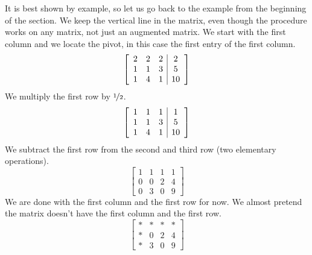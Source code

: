 \documentclass{ximera}
\begin{document}
It is best shown by example, so let us go back to the example from the beginning of the section. We keep the vertical line in the matrix, even though the procedure works on any matrix, not just an augmented matrix. We start with the first column and we locate the pivot, in this case the first entry of the first column.
\begin{equation*}
    \left[
        \begin{array}{ccc|c}
            2 & 2 & 2 & 2 \\
            1 & 1 & 3 & 5 \\
            1 & 4 & 1 & 10
        \end{array}
    \right]
\end{equation*}
We multiply the first row by $\nicefrac{1}{2}$.
\begin{equation*}
    \left[
        \begin{array}{ccc|c}
            1 & 1 & 1 & 1 \\
            1 & 1 & 3 & 5 \\
            1 & 4 & 1 & 10
        \end{array}
    \right]
\end{equation*}
We subtract the first row from the second and third row (two elementary operations).
\begin{equation*}
    \left[
        \begin{array}{ccc|c}
            1 & 1 & 1 & 1 \\
            0 & 0 & 2 & 4 \\
            0 & 3 & 0 & 9
        \end{array}
    \right]
\end{equation*}
We are done with the first column and the first row for now.  We almost pretend the matrix doesn't have the first column and the first row.
\begin{equation*}
    \left[
        \begin{array}{ccc|c}
            * & * & * & * \\
            * & 0 & 2 & 4 \\
            * & 3 & 0 & 9
        \end{array}
    \right]
\end{equation*}
\end{document}
